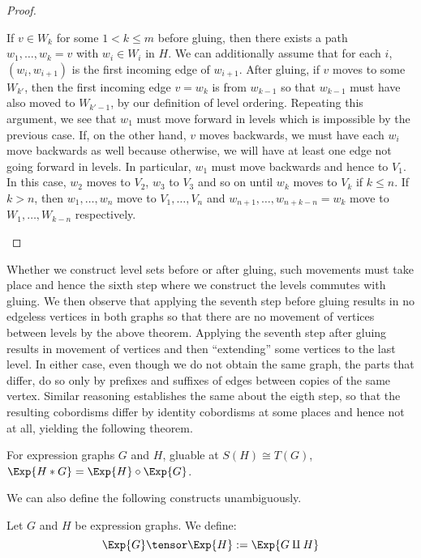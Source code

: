 \documentclass[./Thick_TQFTs_and_Quantum_Information.tex]{subfiles}
\begin{document}
\begin{proof}
\begin{enmrt}
\li If $v \in W_k$ for some $1 < k \leq m$ before gluing, then there exists a
path $w_1, \dots, w_k = v$ with $w_i \in W_i$ in $H$. We can additionally assume
that for each $i$, $(w_i, w_{i + 1})$ is the first incoming edge of $w_{i + 1}$.
After gluing, if $v$ moves to some $W_{k'}$, then the first incoming edge
$v = w_k$ is from $w_{k - 1}$ so that $w_{k - 1}$ must have also moved to
$W_{k' - 1}$, by our definition of level ordering. Repeating this argument, we
see that $w_1$ must move forward in levels which is impossible by the previous
case. If, on the other hand, $v$ moves backwards, we must have each $w_i$ move
backwards as well because otherwise, we will have at least one edge not going
forward in levels. In particular, $w_1$ must move backwards and hence to $V_1$.
In this case, $w_2$ moves to $V_2$, $w_3$ to $V_3$ and so on until $w_k$ moves
to $V_k$ if $k \leq n$. If $k > n$, then $w_1, \dots, w_n$ move to
$V_1, \dots, V_n$ and $w_{n + 1}, \dots, w_{n + k - n} = w_k$ move to
$W_1, \dots, W_{k - n}$ respectively.
\end{enmrt}
\end{proof}

Whether we construct level sets before or after gluing, such movements must take
place and hence the sixth step where we construct the levels commutes with
gluing. We then observe that applying the seventh step before gluing results in
no edgeless vertices in both graphs so that there are no movement of vertices
between levels by the above theorem. Applying the seventh step after gluing
results in movement of vertices and then ``extending'' some vertices to the last
level. In either case, even though we do not obtain the same graph, the parts
that differ, do so only by prefixes and suffixes of edges between copies of the
same vertex. Similar reasoning establishes the same about the eigth step, so
that the resulting cobordisms differ by identity cobordisms at some places and
hence not at all, yielding the following theorem.

\begin{thm}
For expression graphs $G$ and $H$, gluable at $S(H) \cong T(G)$,
$\Exp{H * G} = \Exp{H} \circ \Exp{G}$.
\end{thm}

We can also define the following constructs unambiguously.

\begin{defn}
Let $G$ and $H$ be expression graphs. We define:
\[
  \Exp{G} \tensor \Exp{H} := \Exp{G \amalg H}
\]
\end{defn}
\end{document}
